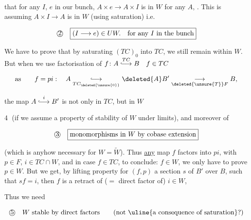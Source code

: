 

 that for any  $I$, $e$  in our bunch, $A\times e\longrightarrow A\times I$ is in $W$ for any $A$, . This is  assuming $A\times I\longrightarrow A$ is in $W$ (using saturation) i.e.

\[
\text{\textcircled{2}}\quad\boxed{(I\longrightarrow e)\in UW.\quad\text{for any }I\text{ in the bunch}}
\]

We have to prove that by saturating $(TC)_0$ into $TC$, we still remain within $W$. But when we use factorisation of $f\colon A\overset{TC}{\lhook\joinrel\longrightarrow}B\quad f\in TC$

\[
\text{as}\qquad f=pi:\quad A\underset{TC_{\deleted{\unsure{0}}}}{\lhook\joinrel\longrightarrow}\deleted{A}B'\underset{\deleted{\unsure{T}}F}{\longrightarrow}B,
\]

the map $A\overset{i}{\lhook\joinrel\longrightarrow}B'$ is not only in $TC$, but  in $W$

\textcircled{4} (if we assume a property of stability of $W$ under  limits), and moreover  of 


\[
\text{\textcircled{3}}\quad\boxed{\text{monomorphisms in }W\text{ by cobase extension}}
\]

(which is anyhow necessary for $W=\widetilde W$).  Thus \uline{any} map $f$ factors into $pi$, with $p\in F$, $i\in TC\cap W$, and in case $f\in TC$, to conclude: $f\in W$, we only have to prove $p\in W$. But we get, by lifting property for $(f,p)$ a section $s$ of $B'$ over $B$, such that $sf=i$, then $f$ is a retract of ($={}$ direct factor of) $i\in W$,


Thus we need 

\[
\text{\textcircled{5}}\quad W\ \text{stable by direct factors}\qquad\text{(not \uline{a consequence of saturation}?)}
\]

